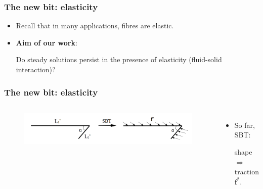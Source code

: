 \documentclass{beamer}
\newcommand{\bi}{\begin{itemize}}
\newcommand{\ei}{\end{itemize}}
\begin{document}

\begin{frame}
	\frametitle{The new bit: elasticity}
	\begin{overlayarea}{\textwidth}{\textheight}\vspace{1cm}
	\Large \bi
	\item Recall that in many applications, fibres are elastic.
	\vspace{1cm}
	\item \textbf{Aim of our work}: 
	
	Do steady solutions persist in the presence of elasticity (fluid-solid interaction)?
	\ei
	\end{overlayarea}
\end{frame}


\begin{frame}
	\frametitle{The new bit: elasticity}
	\begin{overlayarea}{\textwidth}{\textheight}
\vspace{-0.5cm}
		\begin{columns}
			\vspace{-0.5cm}
		\begin{figure}[htb]
			\begin{center}
				\includegraphics[width=1.05\textwidth]{plots/schematic/shape_to_traction.png}
			\end{center}
		\end{figure}
		\bi 
		\item \small So far, SBT:
		
		 shape $\Longrightarrow$ traction $\mathbf{f}^*$.
		\ei
	\end{columns}
	\end{overlayarea}
\end{frame}

\end{document}
